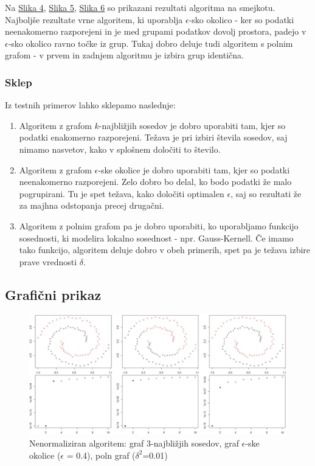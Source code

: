\documentclass[a4paper, 10pt]{article}
\begin{document}
Na \underline{Slika 4}, \underline{Slika 5}, \underline{Slika 6} so prikazani rezultati algoritma na smejkotu. Najboljše rezultate vrne algoritem, ki uporablja $\epsilon$-sko okolico - ker so podatki neenakomerno razporejeni in je med grupami podatkov dovolj prostora, padejo v $\epsilon$-sko okolico ravno točke iz grup. Tukaj dobro deluje tudi algoritem s polnim grafom - v prvem in zadnjem algoritmu je izbira grup identična.

\subsubsection{Sklep}

Iz testnih primerov lahko sklepamo naslednje:
\begin{enumerate}
\item Algoritem z grafom $k$-najbližjih sosedov je dobro uporabiti tam, kjer so podatki enakomerno razporejeni. Težava je pri izbiri števila sosedov, saj nimamo nasvetov, kako v splošnem določiti to število.
\item Algoritem z grafom $\epsilon$-ske okolice je dobro uporabiti tam, kjer so podatki neenakomerno razporejeni. Zelo dobro bo delal, ko bodo podatki že malo pogrupirani. Tu je spet težava, kako določiti optimalen $\epsilon$, saj so rezultati že za majhna odstopanja precej drugačni.
\item Algoritem z polnim grafom pa je dobro uporabiti, ko uporabljamo funkcijo sosednosti, ki modelira lokalno sosednost - npr. Gauss-Kernell. Če imamo tako funkcijo, algoritem deluje dobro v obeh primerih, spet pa je težava izbire prave vrednosti $\delta$. 
\end{enumerate}

\subsection{Grafični prikaz}

\begin{figure}[h]
\caption{Nenormaliziran algoritem: graf 3-najbližjih sosedov, graf $\epsilon$-ske okolice ($\epsilon$ = 0.4), poln graf ($\delta^2$=0.01)}
\includegraphics[width=\textwidth]{unnorm-spiral}
\end{figure}
\end{document}
